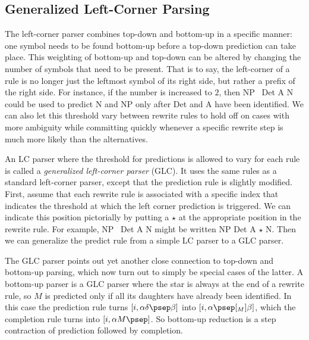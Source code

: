 \subsection{Generalized Left-Corner Parsing}
\label{sub:LeftCorner_Generalized}

The left-corner parser combines top-down and bottom-up in a specific manner: one symbol needs to be found bottom-up before a top-down prediction can take place.
This weighting of bottom-up and top-down can be altered by changing the number of symbols that need to be present.
That is to say, the left-corner of a rule is no longer just the leftmost symbol of its right side, but rather a prefix of the right side.
For instance, if the number is increased to $2$, then NP \rewrite\ Det A N could be used to predict N and NP only after Det and A have been identified.
We can also let this threshold vary between rewrite rules to hold off on cases with more ambiguity while committing quickly whenever a specific rewrite step is much more likely than the alternatives.

An LC parser where the threshold for predictions is allowed to vary for each rule is called a \emph{generalized left-corner parser} (GLC).
It uses the same rules as a standard left-corner parser, except that the prediction rule is slightly modified.
First, assume that each rewrite rule is associated with a specific index that indicates the threshold at which the left corner prediction is triggered.
We can indicate this position pictorially by putting a $\star$ at the appropriate position in the rewrite rule.
For example, NP \rewrite\ Det A N might be written NP \rewrite Det A $\star$ N.
Then we can generalize the predict rule from a simple LC parser to a GLC parser.
%
\begin{prooftree}
\end{prooftree}

The GLC parser points out yet another close connection to top-down and bottom-up parsing, which now turn out to simply be special cases of the latter.
A bottom-up parser is a GLC parser where the star is always at the end of a rewrite rule, so $M$ is predicted only if all its daughters have already been identified.
In this case the prediction rule turns $[i, \alpha \delta \psep \beta]$ into $[i, \alpha \psep [_M] \beta]$, which the completion rule turns into $[i, \alpha M \psep]$.
So bottom-up reduction is a step contraction of prediction followed by completion.

